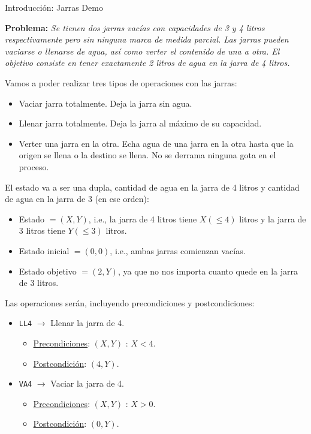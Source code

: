 \documentclass[11pt, a4paper, spanish, openright, twoside]{book}
\begin{document}
\begin{section}{Introducción: Jarras Demo}

	\textbf{Problema:} \textit{Se tienen dos jarras vacías con capacidades de 3 y 4 litros respectivamente pero sin ninguna marca de medida parcial. Las jarras pueden vaciarse o llenarse de agua, así como verter el contenido de una a otra. El objetivo consiste en tener exactamente 2 litros de agua en la jarra de 4 litros.}

	Vamos a poder realizar tres tipos de operaciones con las jarras:
	
	\begin{itemize}

		\item Vaciar jarra totalmente. Deja la jarra sin agua.
		\item Llenar jarra totalmente. Deja la jarra al máximo de su capacidad.
		\item Verter una jarra en la otra. Echa agua de una jarra en la otra hasta que la origen se llena 
			o la destino se llena. No se derrama ninguna gota en el proceso.
	\end{itemize}
	El estado va a ser una dupla, cantidad de agua en la jarra de 4 litros y cantidad de agua en la jarra de 3 (en ese orden):
	\begin{itemize} 
		
		\item Estado $= (X, Y)$, i.e., la jarra de 4 litros tiene $X(\le 4)$ litros y la jarra de 3 litros tiene $Y(\le 3)$ litros.
		\item Estado inicial $= (0, 0)$, i.e., ambas jarras comienzan vacías.
		\item Estado objetivo $= (2, Y)$, ya que no nos importa cuanto quede en la jarra de 3 litros.
		
	\end{itemize}
	
	Las operaciones serán, incluyendo precondiciones y postcondiciones:
		\begin{itemize}
		\item \texttt{LL4} $\rightarrow$ Llenar la jarra de 4.
			\begin{itemize}
			\item \underline{Precondiciones}: $ (X, Y)$ : $X < 4$.
			\item \underline{Postcondición}: $(4, Y)$.
			\end{itemize}
		
		\item \texttt{VA4} $\rightarrow$ Vaciar la jarra de 4.
			\begin{itemize}
			\item \underline{Precondiciones}: $(X, Y)$ : $X > 0$.
			\item \underline{Postcondición}: $(0, Y)$.
			\end{itemize}


\end{itemize}
\end{section}
\end{document}
